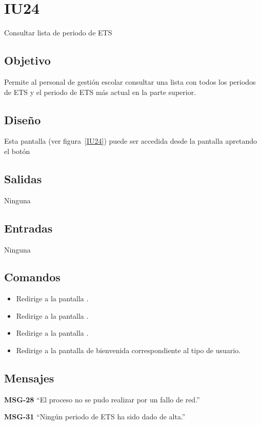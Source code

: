 
\section{IU24}{Consultar lista de periodo de ETS}
\subsection{Objetivo}
   Permite al personal de gestión escolar consultar una lista con todos los periodos de ETS y el periodo de ETS más actual en la parte superior.
\subsection{Diseño}
    Esta pantalla  (ver figura~\ref{IU24}) puede ser accedida desde la pantalla  apretando el botón 

\subsection{Salidas}
Ninguna
\subsection{Entradas}
Ninguna
\subsection{Comandos}
\begin{itemize}
    \item {} Redirige a la pantalla .
    \item {} Redirige a la pantalla .
    \item {} Redirige a la pantalla .
    \item {} Redirige a la pantalla de bienvenida correspondiente al tipo de usuario.
    
\end{itemize}

\subsection{Mensajes}

\begin{Citemize}
    \item {\bf MSG-28}  ``El proceso no se pudo realizar por un fallo de red.''
    \item {\bf MSG-31}  ``Ningún periodo de ETS ha sido dado de alta.''
\end{Citemize}


